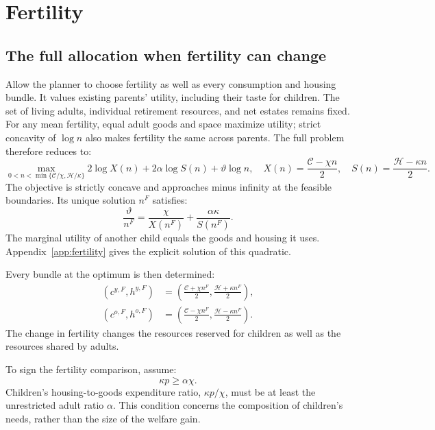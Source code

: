 \documentclass[11pt]{article}
\begin{document}
\section{Fertility}

\subsection{The full allocation when fertility can change}

Allow the planner to choose fertility as well as every consumption and
housing bundle. It values existing parents' utility, including their taste
for children. The set of living adults, individual retirement resources,
and net estates remains fixed. For any mean fertility, equal adult goods
and space maximize utility; strict concavity of $\log n$ also makes fertility
the same across parents. The full problem therefore reduces to:
\begin{equation}
\max_{0<n<\min\{\mathcal C/\chi,\mathcal H/\kappa\}}
 2\log X(n)+2\alpha\log S(n)+\vartheta\log n,
\quad
X(n)=\frac{\mathcal C-\chi n}{2},\quad
S(n)=\frac{\mathcal H-\kappa n}{2}.
\label{eq:joint_problem}
\end{equation}
The objective is strictly concave and approaches minus infinity at the
feasible boundaries. Its unique solution $n^F$ satisfies:
\begin{equation}
\frac{\vartheta}{n^F}
 =\frac{\chi}{X(n^F)}+\frac{\alpha\kappa}{S(n^F)}.
\label{eq:joint_foc}
\end{equation}
The marginal utility of another child equals the goods and housing it uses.
Appendix~\ref{app:fertility} gives the explicit solution of this quadratic.

Every bundle at the optimum is then determined:
\begin{equation}
\boxed{\begin{aligned}
(c^{y,F},h^{y,F})
 &=\left(\frac{\mathcal C+\chi n^F}{2},
         \frac{\mathcal H+\kappa n^F}{2}\right),\\
(c^{o,F},h^{o,F})
 &=\left(\frac{\mathcal C-\chi n^F}{2},
         \frac{\mathcal H-\kappa n^F}{2}\right).
\end{aligned}}
\label{eq:joint_allocation}
\end{equation}
The change in fertility changes the resources reserved for children as well
as the resources shared by adults.

To sign the fertility comparison, assume:
\begin{equation}
\boxed{\kappa p\ge\alpha\chi.}
\tag{A4}\label{ass:child_cost}
\end{equation}
Children's housing-to-goods expenditure ratio, $\kappa p/\chi$, must be at
least the unrestricted adult ratio $\alpha$. This condition concerns the
composition of children's needs, rather than the size of the welfare gain.
\end{document}
